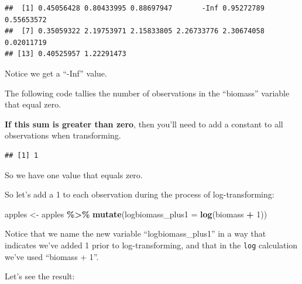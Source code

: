 \documentclass[
]{book}
\newenvironment{Shaded}{\begin{snugshade}}{\end{snugshade}}
\newcommand{\AttributeTok}[1]{\textcolor[rgb]{0.13,0.29,0.53}{#1}}
\newcommand{\DecValTok}[1]{\textcolor[rgb]{0.00,0.00,0.81}{#1}}
\newcommand{\FunctionTok}[1]{\textcolor[rgb]{0.13,0.29,0.53}{\textbf{#1}}}
\newcommand{\NormalTok}[1]{#1}
\newcommand{\OtherTok}[1]{\textcolor[rgb]{0.56,0.35,0.01}{#1}}
\newcommand{\SpecialCharTok}[1]{\textcolor[rgb]{0.81,0.36,0.00}{\textbf{#1}}}
\begin{document}
\begin{Shaded}
\end{Shaded}

\begin{verbatim}
##  [1] 0.45056428 0.80433995 0.88697947       -Inf 0.95272789 0.55653572
##  [7] 0.35059322 2.19753971 2.15833805 2.26733776 2.30674058 0.02011719
## [13] 0.40525957 1.22291473
\end{verbatim}

Notice we get a ``-Inf'' value.

The following code tallies the number of observations in the ``biomass'' variable that equal zero.

\textbf{If this sum is greater than zero}, then you'll need to add a constant to all observations when transforming.

\begin{Shaded}
\end{Shaded}

\begin{verbatim}
## [1] 1
\end{verbatim}

So we have one value that equals zero.

So let's add a 1 to each observation during the process of log-transforming:

\begin{Shaded}
\begin{Highlighting}[]
\NormalTok{apples }\OtherTok{\textless{}{-}}\NormalTok{ apples }\SpecialCharTok{\%\textgreater{}\%}
  \FunctionTok{mutate}\NormalTok{(}\AttributeTok{logbiomass\_plus1 =} \FunctionTok{log}\NormalTok{(biomass }\SpecialCharTok{+} \DecValTok{1}\NormalTok{))}
\end{Highlighting}
\end{Shaded}

Notice that we name the new variable ``logbiomass\_plus1'' in a way that indicates we've added 1 prior to log-transforming, and that in the \texttt{log} calculation we've used ``biomass + 1''.

Let's see the result:
\end{document}
